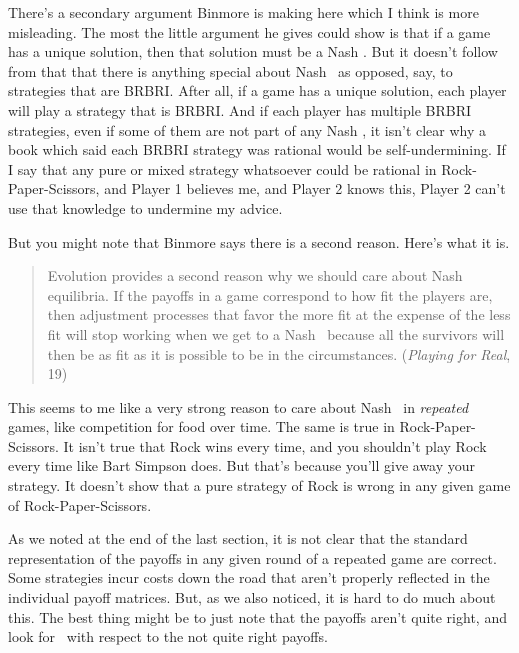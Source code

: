 There's a secondary argument Binmore is making here which I think is more misleading. The most the little argument he gives could show is that if a game has a unique solution, then that solution must be a Nash \eqm. But it doesn't follow from that that there is anything special about Nash \eqm\ as opposed, say, to strategies that are BRBRI. After all, if a game has a unique solution, each player will play a strategy that is BRBRI. And if each player has multiple BRBRI strategies, even if some of them are not part of any Nash \eqm, it isn't clear why a book which said each BRBRI strategy was rational would be self-undermining. If I say that any pure or mixed strategy whatsoever could be rational in Rock-Paper-Scissors, and Player 1 believes me, and Player 2 knows this, Player 2 can't use that knowledge to undermine my advice.

But you might note that Binmore says there is a second reason. Here's what it is.

\begin{quote}
Evolution provides a second reason why we should care about Nash equilibria. If the payoffs in a game correspond to how fit the players are, then adjustment processes that favor the more fit at the expense of the less fit will stop working when we get to a Nash \eqm\ because all the survivors will then be as fit as it is possible to be in the circumstances. (\textit{Playing for Real}, 19)
\end{quote}

\noindent This seems to me like a very strong reason to care about Nash \eqm\ in \textit{repeated} games, like competition for food over time. The same is true in Rock-Paper-Scissors. It isn't true that Rock wins every time, and you shouldn't play Rock every time like Bart Simpson does. But that's because you'll give away your strategy. It doesn't show that a pure strategy of Rock is wrong in any given game of Rock-Paper-Scissors.

As we noted at the end of the last section, it is not clear that the standard representation of the payoffs in any given round of a repeated game are correct. Some strategies incur costs down the road that aren't properly reflected in the individual payoff matrices. But, as we also noticed, it is hard to do much about this. The best thing might be to just note that the payoffs aren't quite right, and look for \eqm\ with respect to the not quite right payoffs.

